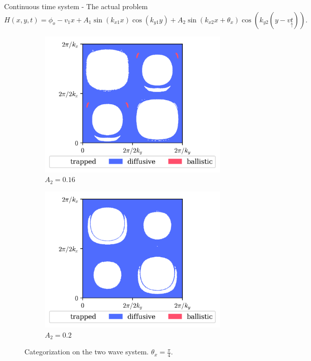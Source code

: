 \documentclass[10pt]{beamer}
\begin{document}
\begin{frame}{Continuous time system - The actual problem}
    \begin{equation*}
        H(x,y,t) = \phi_o - v_1x + A_1 \sin(k_{x1}x)\cos(k_{y1}y) + {A_2}\sin(k_{x2}x + \theta_x)\cos(k_{y2}(y - v\underset{\uparrow}{t})).
      \end{equation*}
    
  
    \begin{figure}
        \begin{subfigure}[b]{0.45\textwidth}
            \includegraphics[width=\textwidth]{graf_2ondas/000.1600_000.7854.png}
            \caption{$A_2 = 0.16$}
        \end{subfigure}
        \begin{subfigure}[b]{0.45\textwidth}
            \includegraphics[width=\textwidth]{graf_2ondas/000.2100_000.7854.png}
            \caption{$A_2 = 0.2$}
        \end{subfigure}
        \caption{Categorization on the two wave system. $\theta_x = \frac{\pi}{4}$.}
    \end{figure}
\end{frame}
\end{document}
